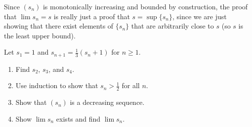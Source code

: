 \documentclass[11pt]{scrartcl}
\providecommand{\half}{\frac{1}{2}}
\providecommand{\ii}{\item}
\theoremstyle{problem}
\newenvironment{problem}[1]
{\renewcommand\theinnercustomthm{#1}\innercustomthm}
{\endinnercustomthm}
\theoremstyle{remark}
\newenvironment{remark}
{\renewcommand\theremarknumbered{\hspace{-\the\fontdimen2\font\space}}\remarknumbered}
{\endremarknumbered}
\begin{document}
\begin{remark}
	Since $(s_n)$ is monotonically increasing and bounded
	by construction, the proof that $\lim s_n = s$ is really just
	a proof that $s = \sup\{s_n\}$, since we are just showing that
	there exist elements of $\{s_n\}$ that are arbitrarily close to $s$
	(so $s$ is the least upper bound).
\end{remark}

\pagebreak
\begin{problem}{10.10}
	Let $s_1 = 1$ and $s_{n+1} = \frac13 (s_n + 1)$ for $n\ge 1$.
	\begin{enumerate}[\emph{\textbf{(\alph*)}}]
		\ii Find $s_2$, $s_3$, and $s_4$.
		\ii Use induction to show that $s_n > \half$ for all $n$.
		\ii Show that $(s_n)$ is a decreasing sequence.
		\ii Show $\lim s_n$ exists and find $\lim s_n$.
	\end{enumerate}
\end{problem}
\end{document}
